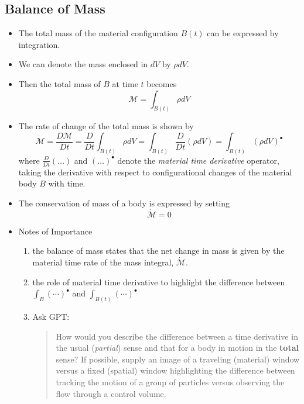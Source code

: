 \documentclass[11pt]{article}
\begin{document}
\subsection*{Balance of Mass}
\label{sec:orgbee2999}
\begin{itemize}
\item The total mass of the material configuration \(B(t)\) can be expressed by integration.
\item We can denote the mass enclosed in \(dV\) by \(\rho dV\).
\item Then the total mass of \(B\) at time \(t\) becomes
$$ \mathcal{M} = \int_{B(t)} \rho dV $$
\item The rate of change of the total mass is shown by
$$ \dot{\mathcal{M}} = \frac{D \mathcal{M}}{Dt} = \frac{D}{Dt} \int_{B(t)} \rho dV = \int_{B(t)} \frac{D}{Dt} (\rho dV) = \int_{B(t)} (\rho dV)^{\!\bullet}  $$
where \(\frac{D}{Dt}(\ldots)\) and \((\ldots)^{\!\bullet}\) denote the \emph{material time derivative} operator, taking the derivative with respect to configurational changes of the material body \(B\) with time.
\item The conservation of mass of a body is expressed by setting
$$ \dot{\mathcal{M}} = 0 $$
\end{itemize}
\begin{itemize}
\item Notes of Importance
\label{sec:orgba37eda}
\begin{enumerate}
\item the balance of mass states that the net change in mass is given by the material time rate of the mass integral, \(\dot{\mathcal{M}}\).
\item the role of material time derivative to highlight the difference between \(\int_B (\cdots)^{\!\bullet}\) and \(\int_{B(t)} (\cdots)^{\!\bullet}\)
\item Ask GPT:
\begin{quote}
How would you describe the difference between a time derivative in the usual (\emph{partial}) sense and that for a body in motion in the \textbf{total} sense? If possible, supply an image of a traveling (material) window versus a fixed (spatial) window highlighting the difference between tracking the motion of a group of particles versus observing the flow through a control volume.
\end{quote}
\end{enumerate}
\end{itemize}
\end{document}

